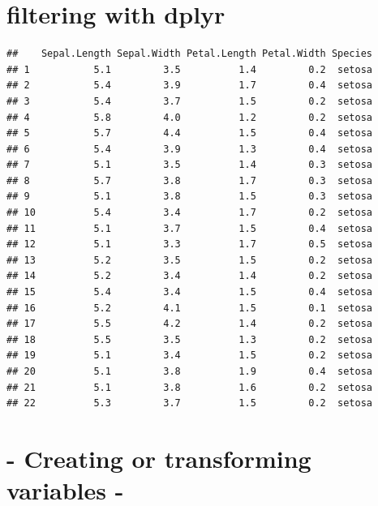 \documentclass[]{article}
\newenvironment{Shaded}{\begin{snugshade}}{\end{snugshade}}
\newcommand{\FloatTok}[1]{\textcolor[rgb]{0.00,0.00,0.81}{#1}}
\newcommand{\KeywordTok}[1]{\textcolor[rgb]{0.13,0.29,0.53}{\textbf{#1}}}
\newcommand{\NormalTok}[1]{#1}
\newcommand{\OperatorTok}[1]{\textcolor[rgb]{0.81,0.36,0.00}{\textbf{#1}}}
\newcommand{\StringTok}[1]{\textcolor[rgb]{0.31,0.60,0.02}{#1}}
\begin{document}
\hypertarget{filtering-with-dplyr}{%
\section{filtering with dplyr}\label{filtering-with-dplyr}}

\begin{Shaded}
\end{Shaded}

\begin{verbatim}
##    Sepal.Length Sepal.Width Petal.Length Petal.Width Species
## 1           5.1         3.5          1.4         0.2  setosa
## 2           5.4         3.9          1.7         0.4  setosa
## 3           5.4         3.7          1.5         0.2  setosa
## 4           5.8         4.0          1.2         0.2  setosa
## 5           5.7         4.4          1.5         0.4  setosa
## 6           5.4         3.9          1.3         0.4  setosa
## 7           5.1         3.5          1.4         0.3  setosa
## 8           5.7         3.8          1.7         0.3  setosa
## 9           5.1         3.8          1.5         0.3  setosa
## 10          5.4         3.4          1.7         0.2  setosa
## 11          5.1         3.7          1.5         0.4  setosa
## 12          5.1         3.3          1.7         0.5  setosa
## 13          5.2         3.5          1.5         0.2  setosa
## 14          5.2         3.4          1.4         0.2  setosa
## 15          5.4         3.4          1.5         0.4  setosa
## 16          5.2         4.1          1.5         0.1  setosa
## 17          5.5         4.2          1.4         0.2  setosa
## 18          5.5         3.5          1.3         0.2  setosa
## 19          5.1         3.4          1.5         0.2  setosa
## 20          5.1         3.8          1.9         0.4  setosa
## 21          5.1         3.8          1.6         0.2  setosa
## 22          5.3         3.7          1.5         0.2  setosa
\end{verbatim}

\hypertarget{creating-or-transforming-variables--}{%
\section{- Creating or transforming variables
-}\label{creating-or-transforming-variables--}}
\end{document}
